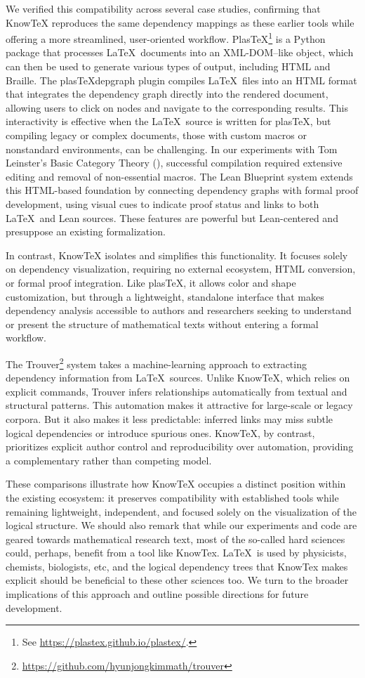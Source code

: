 \documentclass{article}
\begin{document}
We verified this compatibility across several case studies, confirming that KnowTeX reproduces the same dependency mappings as these earlier tools while offering a more streamlined, user-oriented workflow.
PlasTeX\footnote{See \url{https://plastex.github.io/plastex/}.} is a Python package that processes \LaTeX\ documents into an XML-DOM–like object, which can then be used to generate various types of output, including HTML and Braille.
The plasTeXdepgraph plugin compiles \LaTeX\ files into an HTML format that integrates the dependency graph directly into the rendered document, allowing users to click on nodes and navigate to the corresponding results. 
This interactivity is effective when the \LaTeX\ source is written for plasTeX, but compiling legacy or complex documents, those with custom macros or nonstandard environments, can be challenging. 
In our experiments with Tom Leinster’s Basic Category Theory (\cite{leinster2014}), successful compilation required extensive editing and removal of non-essential macros. The Lean Blueprint system extends this HTML-based foundation by connecting dependency graphs with formal proof development, using visual cues to indicate proof status and links to both \LaTeX\ and Lean sources. 
These features are powerful but Lean-centered and presuppose an existing formalization.

In contrast, KnowTeX isolates and simplifies this functionality. 
It focuses solely on dependency visualization, requiring no external ecosystem, HTML conversion, or formal proof integration. 
Like plasTeX, it allows color and shape customization, but through a lightweight, standalone interface that makes dependency analysis accessible to authors and researchers seeking to understand or present the structure of mathematical texts without entering a formal workflow.

The Trouver\footnote{\url{https://github.com/hyunjongkimmath/trouver}} system takes a machine-learning approach to extracting dependency information from \LaTeX\ sources. 
Unlike KnowTeX, which relies on explicit commands, Trouver infers relationships automatically from textual and structural patterns. This automation makes it attractive for large-scale or legacy corpora. But it also makes it less predictable: inferred links may miss subtle logical dependencies or introduce spurious ones. 
KnowTeX, by contrast, prioritizes explicit author control and reproducibility over automation, providing a complementary rather than competing model.

These comparisons illustrate how KnowTeX occupies a distinct position within the existing ecosystem: it preserves compatibility with established tools while remaining lightweight, independent, and focused solely on the visualization of the logical structure. 
We should also remark that while our experiments and code are geared towards mathematical research text, most of the so-called hard sciences could, perhaps,  benefit from a tool like  KnowTex. \LaTeX\ is used by physicists, chemists, biologists,  etc, and the logical dependency trees that KnowTex makes explicit should be beneficial to these other sciences too.
We turn to the broader implications of this approach and outline possible directions for future development.
\end{document}
